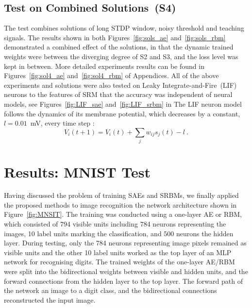 \subsection{Test on Combined Solutions~(S4)}
The test combines solutions of long STDP window, noisy threshold and teaching signals.
The results shown in both Figures~\ref{fig:sols_ae} and~\ref{fig:sols_rbm} demonstrated a combined effect of the solutions, in that the dynamic trained weights were between the diverging degree of S2 and S3, and the loss level was kept in between.
More detailed experiments results can be found in Figures~\ref{fig:sol4_ae} and~\ref{fig:sol4_rbm} of Appendices.
All of the above experiments and solutions were also tested on Leaky Integrate-and-Fire~(LIF) neurons to \protect{} \protect{} the features of \protect{} SRM that the accuracy was independent of neural models, see Figures~\ref{fig:LIF_sae} and~\ref{fig:LIF_srbm} in \protect{} \protect{}
The LIF neuron model follows the dynamics of its membrane potential, which decreases by a constant, $l=0.01$~mV, every time step :
\begin{equation}
V_i(t+1)=V_i(t) + \sum_j w_{ij} s_j(t) - l~.
\end{equation}


\section{Results: MNIST Test}
\protect\TLSins{\label{sec:SRM_result}}
Having discussed the problem of training \protect{} SAEs and SRBMs, we finally applied the proposed methods to \protect{} image recognition \protect{} \protect{}
the network architecture \protect{} \protect{} shown in Figure~\ref{fig:MNSIT}.
The training was conducted using a one-layer AE or RBM, which consisted of 794 visible units including 784 neurons representing the images, 10 label units marking the classification, and 500 neurons \protect{} \protect{} the hidden layer.
During testing, only the 784 neurons representing image pixels remained as visible units and the other 10 label units worked as the top layer of an MLP network for recognising digits.
The trained weights of the one-layer AE/RBM were split into the bidirectional weights between visible and hidden units, and the forward connections from the hidden layer to the top layer.
The forward path of the network \protect{} \protect{} an image to a digit class, and the bidirectional connections reconstructed the input image.

